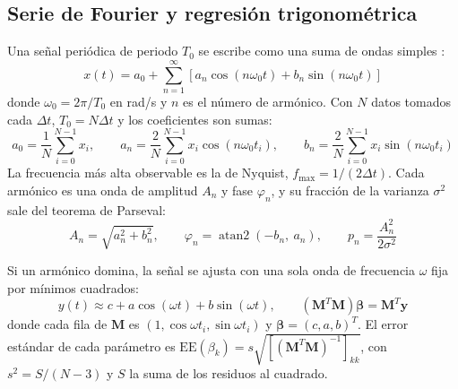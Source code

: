 \documentclass[11pt,letterpaper]{article}
\begin{document}
\subsection{Serie de Fourier y regresión trigonométrica}
Una señal periódica de periodo $T_0$ se escribe como una suma de ondas simples \parencite{fourier1822,kreyszig2011}:
\begin{equation}
x(t) = a_0 + \sum_{n=1}^{\infty}\left[a_n\cos(n\omega_0 t) + b_n\sin(n\omega_0 t)\right]
\label{eq:fourier}
\end{equation}
donde $\omega_0 = 2\pi/T_0$ en \si{rad/s} y $n$ es el número de armónico. Con $N$ datos tomados cada $\Delta t$, $T_0 = N\Delta t$ y los coeficientes son sumas:
\begin{equation}
a_0 = \frac{1}{N}\sum_{i=0}^{N-1} x_i, \qquad
a_n = \frac{2}{N}\sum_{i=0}^{N-1} x_i\cos(n\omega_0 t_i), \qquad
b_n = \frac{2}{N}\sum_{i=0}^{N-1} x_i\sin(n\omega_0 t_i)
\label{eq:coef}
\end{equation}
La frecuencia más alta observable es la de Nyquist, $f_{\max} = 1/(2\Delta t)$. Cada armónico es una onda de amplitud $A_n$ y fase $\varphi_n$, y su fracción de la varianza $\sigma^2$ sale del teorema de Parseval:
\begin{equation}
A_n = \sqrt{a_n^2 + b_n^2}, \qquad \varphi_n = \operatorname{atan2}(-b_n,\ a_n), \qquad p_n = \frac{A_n^2}{2\sigma^2}
\label{eq:Apn}
\end{equation}

Si un armónico domina, la señal se ajusta con una sola onda de frecuencia $\omega$ fija por mínimos cuadrados:
\begin{equation}
y(t) \approx c + a\cos(\omega t) + b\sin(\omega t), \qquad \left(\mathbf{M}^{T}\mathbf{M}\right)\boldsymbol{\beta} = \mathbf{M}^{T}\mathbf{y}
\label{eq:reg}
\end{equation}
donde cada fila de $\mathbf{M}$ es $(1, \cos\omega t_i, \sin\omega t_i)$ y $\boldsymbol{\beta} = (c, a, b)^T$. El error estándar de cada parámetro es $\mathrm{EE}(\beta_k) = s\sqrt{[(\mathbf{M}^T\mathbf{M})^{-1}]_{kk}}$, con $s^2 = S/(N-3)$ y $S$ la suma de los residuos al cuadrado.
\end{document}
